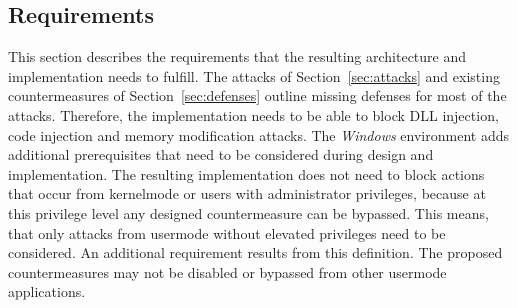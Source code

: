 \subsection{Requirements}
This section describes the requirements that the resulting architecture and implementation needs to fulfill. The attacks of Section~\ref{sec:attacks} and existing countermeasures of Section~\ref{sec:defenses} outline missing defenses for most of the attacks. Therefore, the implementation needs to be able to block \gls{DLL} injection, code injection and memory modification attacks. The \emph{Windows} environment adds additional prerequisites that need to be considered during design and implementation. The resulting implementation does not need to block actions that occur from kernelmode or users with administrator privileges, because at this privilege level any designed countermeasure can be bypassed. This means, that only attacks from usermode without elevated privileges need to be considered. An additional requirement results from this definition. The proposed countermeasures may not be disabled or bypassed from other usermode applications.